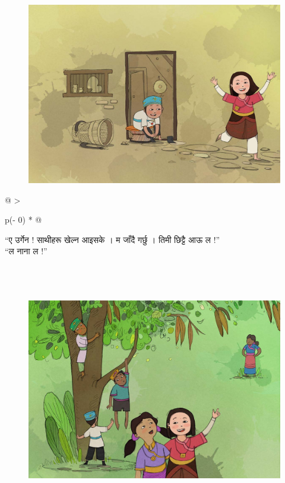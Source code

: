 \documentclass[
  letterpaper,
  DIV=11,
  numbers=noendperiod,
  paper=6in:9in,
  pagesize=pdftex,
  headinclude=on,
  footinclude=on,
  12pt]{scrreprt}
\begin{document}
\begin{figure}[H]

{\centering \includegraphics{images/p-2.jpg}

}

\end{figure}

\begin{longtable}[]{@{}
  >{\raggedright\arraybackslash}p{(\columnwidth - 0\tabcolsep) * }@{}}
\toprule\noalign{}
\endhead
\bottomrule\noalign{}
\endlastfoot
\begin{minipage}[t]{\linewidth}\raggedright
``ए उर्गेन ! साथीहरू खेल्न आइसके । म जाँदै गर्छु । तिमी छिट्टै आऊ ल !''\\
``ल नाना ल !''\strut
\end{minipage} \\
\end{longtable}


\hypertarget{section-1}{%
\chapter{}\label{section-1}}

\begin{figure}[H]

{\centering \includegraphics{images/p-3.jpg}

}

\end{figure}
\end{document}
